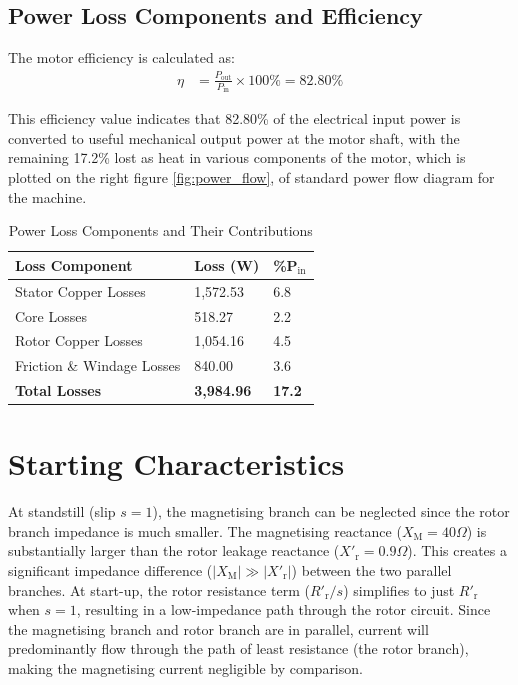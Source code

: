 \documentclass[a4paper,11pt]{IEEEtran}
\begin{document}
\subsection{Power Loss Components and Efficiency}

 



The motor efficiency is calculated as:
\begin{equation}
\begin{split}
    \eta &= \frac{P_{\text{out}}}{P_{\text{in}}} \times 100\% = 82.80\%
\end{split}
\end{equation}

This efficiency value indicates that 82.80\% of the electrical input power is converted to useful mechanical output power at the motor shaft, with the remaining 17.2\% lost as heat in various components of the motor, which is plotted on the right figure \ref{fig:power_flow}, of standard power flow diagram for the machine.
 \begin{table}[h!]
\centering
\caption{Power Loss Components and Their Contributions}
\begin{tabular}{|l|l|l|}
\hline
\textbf{Loss Component} & \textbf{Loss (W)} & \textbf{\%P$_{\text{in}}$} \\
\hline
Stator Copper Losses & 1,572.53 & 6.8 \\
Core Losses & 518.27 & 2.2 \\
Rotor Copper Losses & 1,054.16 & 4.5 \\
Friction \& Windage Losses & 840.00 & 3.6 \\
\hline
\textbf{Total Losses} & \textbf{3,984.96} & \textbf{17.2} \\
\hline
\end{tabular}
\end{table}
 
 

 

\section{Starting Characteristics}
 
At standstill (slip $s = 1$), the magnetising branch can be neglected since the rotor branch impedance is much smaller. The magnetising reactance ($X_{\mathrm{M}} = 40\Omega$) is substantially larger than the rotor leakage reactance ($X'_{\mathrm{r}} = 0.9\Omega$). This creates a significant impedance difference ($\lvert X_{\mathrm{M}} \rvert \gg \lvert X'_{\mathrm{r}} \rvert$) between the two parallel branches. At start-up, the rotor resistance term ($R'_{\mathrm{r}}/s$) simplifies to just $R'_{\mathrm{r}}$ when $s=1$, resulting in a low-impedance path through the rotor circuit. Since the magnetising branch and rotor branch are in parallel, current will predominantly flow through the path of least resistance (the rotor branch), making the magnetising current negligible by comparison.
\end{document}
